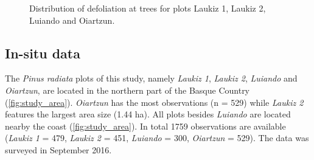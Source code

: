 \documentclass[review]{elsarticle}
\begin{document}
\begin{figure} [t!]
	\begin{center}
		\caption{Distribution of defoliation at trees for plots Laukiz 1, Laukiz 2, Luiando and Oiartzun.}
		\label{fig:defol-distr}
	\end{center}
\end{figure}



\subsection{In-situ data}

\noindent The \textit{Pinus radiata} plots of this study, namely \textit{Laukiz 1}, \textit{Laukiz 2}, \textit{Luiando} and \textit{Oiartzun}, are located in the northern part of the Basque Country (\autoref{fig:study_area}).
\textit{Oiartzun} has the most observations (n = 529) while \textit{Laukiz 2} features the largest area size (1.44 ha).
All plots besides \textit{Luiando} are located nearby the coast (\autoref{fig:study_area}).
In total 1759 observations are available (\textit{Laukiz 1} = 479, \textit{Laukiz 2} = 451, \textit{Luiando} = 300, \textit{Oiartzun} = 529).
The data was surveyed in September 2016.
\end{document}
